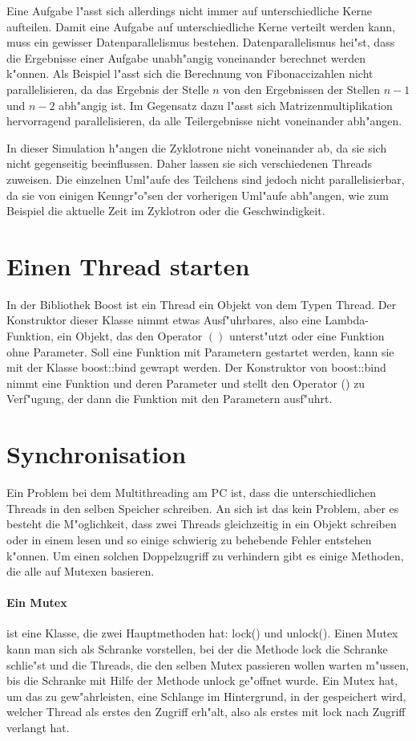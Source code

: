 \documentclass[14pt, a4paper]{report}
\begin{document}
Eine Aufgabe l"asst sich allerdings nicht immer auf unterschiedliche Kerne aufteilen.
Damit eine Aufgabe auf unterschiedliche Kerne verteilt werden kann, muss ein gewisser
Datenparallelismus bestehen. Datenparallelismus hei"st, dass die Ergebnisse einer Aufgabe
unabh"angig voneinander berechnet werden k"onnen. Als Beispiel l"asst sich die
Berechnung von Fibonaccizahlen nicht parallelisieren, da das Ergebnis der Stelle $n$ von
den Ergebnissen der Stellen $n-1$ und $n-2$ abh"angig ist. Im Gegensatz dazu l"asst sich
Matrizenmultiplikation hervorragend parallelisieren, da alle Teilergebnisse nicht voneinander
abh"angen.

In dieser Simulation h"angen die Zyklotrone nicht voneinander ab, da sie sich nicht
gegenseitig beeinflussen. Daher lassen sie sich verschiedenen Threads zuweisen. Die
einzelnen Uml"aufe des Teilchens sind jedoch nicht parallelisierbar, da sie von einigen
Kenngr"o"sen der vorherigen Uml"aufe abh"angen, wie zum Beispiel die aktuelle Zeit 
im Zyklotron oder die Geschwindigkeit.

\section{Einen Thread starten}
In der Bibliothek Boost ist ein Thread ein Objekt von dem Typen Thread. Der
Konstruktor dieser Klasse nimmt etwas Ausf"uhrbares, also eine Lambda-Funktion,
ein Objekt, das den Operator $()$ unterst"utzt oder eine Funktion ohne Parameter.
Soll eine Funktion mit Parametern gestartet werden, kann sie mit der Klasse
boost::bind gewrapt werden. Der Konstruktor von boost::bind nimmt eine Funktion und deren
Parameter und stellt den Operator () zu Verf"ugung, der dann die Funktion mit den 
Parametern ausf"uhrt.

\section{Synchronisation} \label{Synchronisation}
Ein Problem bei dem Multithreading am PC ist, dass die unterschiedlichen Threads in den
selben Speicher schreiben. An sich ist das kein Problem, 
aber es besteht die M"oglichkeit,
dass zwei Threads gleichzeitig in ein Objekt schreiben oder in einem lesen und so einige
schwierig zu behebende Fehler entstehen k"onnen. Um einen solchen Doppelzugriff zu 
verhindern gibt es einige Methoden, die alle auf Mutexen basieren.

\paragraph{Ein Mutex} ist eine Klasse, die zwei Hauptmethoden hat: lock() und unlock(). Einen
Mutex kann man sich als Schranke vorstellen, bei der die Methode lock die Schranke schlie"st
und die Threads, die den selben Mutex passieren wollen warten m"ussen, bis die Schranke
mit Hilfe der Methode unlock ge"offnet wurde. Ein Mutex hat, um das zu gew"ahrleisten, eine
Schlange im Hintergrund, in der gespeichert wird, welcher Thread als erstes den Zugriff
erh"alt, also als erstes mit lock nach Zugriff verlangt hat. 
\end{document}
